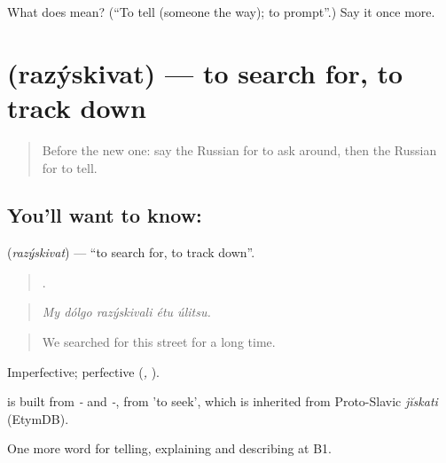 \begin{tcolorbox}[breakable,colback=teal!4,colframe=teal!35!black,title={Before you move on}]
What does  mean? (\textquotedblleft{}To tell (someone the way); to prompt\textquotedblright{}.) Say it once more.
\end{tcolorbox}
\section[\texorpdfstring{\ru{разыскивать} (razýskivat)}{разыскивать (razýskivat)}]{ (razýskivat) — to search for, to track down}

\label{lesson:RU-C441-razyskivat}



\begin{quote}
Before the new one: say the Russian for to ask around, then the Russian for to tell.
\end{quote}

\subsection*{You'll want to know: }
\textbf{} (\emph{razýskivat}) — \textquotedblleft{}to search for, to track down\textquotedblright{}.

\begin{quote}
    .
\end{quote}

\begin{quote}
\emph{My dólgo razýskivali étu úlitsu.}
\end{quote}

\begin{quote}
We searched for this street for a long time.
\end{quote}

Imperfective; perfective \emph{} (\emph{, }).

\begin{cousinweb}
\emph{} is built from \emph{-} and \emph{-}, from \emph{} 'to seek', which is inherited from Proto-Slavic \emph{jĭskati} (EtymDB).
\end{cousinweb}

\begin{grammarlens}[title={What you've built}]
One more word for telling, explaining and describing at B1.
\end{grammarlens}

